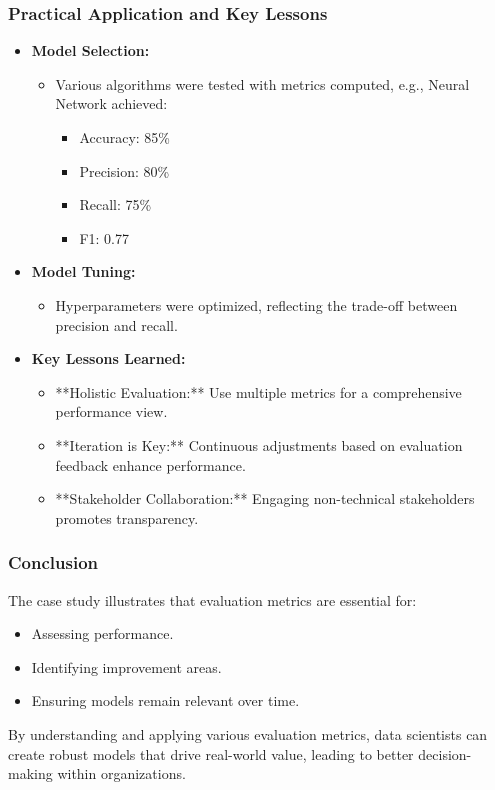 \documentclass[aspectratio=169]{beamer}
\begin{document}
\begin{frame}[fragile]
    \frametitle{Practical Application and Key Lessons}
    \begin{itemize}
        \item \textbf{Model Selection:}
        \begin{itemize}
            \item Various algorithms were tested with metrics computed, e.g., Neural Network achieved:
            \begin{itemize}
                \item Accuracy: 85\%
                \item Precision: 80\%
                \item Recall: 75\%
                \item F1: 0.77
            \end{itemize}
        \end{itemize}

        \item \textbf{Model Tuning:}
        \begin{itemize}
            \item Hyperparameters were optimized, reflecting the trade-off between precision and recall.
        \end{itemize}

        \item \textbf{Key Lessons Learned:}
        \begin{itemize}
            \item **Holistic Evaluation:** Use multiple metrics for a comprehensive performance view.
            \item **Iteration is Key:** Continuous adjustments based on evaluation feedback enhance performance.
            \item **Stakeholder Collaboration:** Engaging non-technical stakeholders promotes transparency.
        \end{itemize}
    \end{itemize}
\end{frame}

\begin{frame}[fragile]
    \frametitle{Conclusion}
    The case study illustrates that evaluation metrics are essential for:
    \begin{itemize}
        \item Assessing performance.
        \item Identifying improvement areas.
        \item Ensuring models remain relevant over time.
    \end{itemize}
    By understanding and applying various evaluation metrics, data scientists can create robust models that drive real-world value, leading to better decision-making within organizations.
\end{frame}
\end{document}
